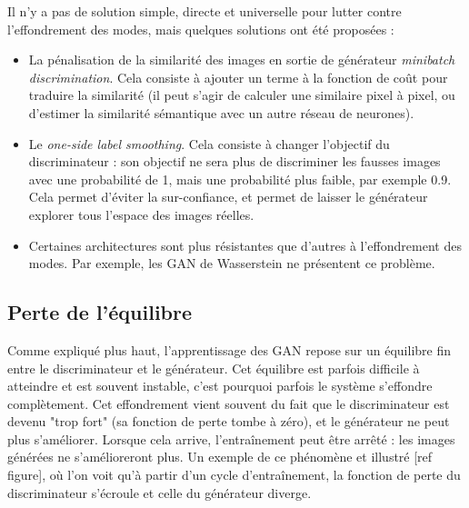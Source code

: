 Il n'y a pas de solution simple, directe et universelle pour lutter contre l'effondrement des modes, mais quelques solutions ont été proposées :
\begin{itemize}
  \item La pénalisation de la similarité des images en sortie de générateur \textit{minibatch discrimination}. Cela consiste à ajouter un terme à la fonction de coût pour traduire la similarité (il peut s'agir de calculer une similaire pixel à pixel, ou d'estimer la similarité sémantique avec un autre réseau de neurones).
  \item Le \textit{one-side label smoothing}. Cela consiste à changer l'objectif du discriminateur : son objectif ne sera plus de discriminer les fausses images avec une probabilité de 1, mais une probabilité plus faible, par exemple 0.9. Cela permet d'éviter la sur-confiance, et permet de laisser le générateur explorer tous l'espace des images réelles.
  \item Certaines architectures sont plus résistantes que d'autres à l'effondrement des modes. Par exemple, les GAN de Wasserstein ne présentent ce problème.
\end{itemize}


\subsection{Perte de l'équilibre}

Comme expliqué plus haut, l'apprentissage des GAN repose sur un équilibre fin entre le discriminateur et le générateur. Cet équilibre est parfois difficile à atteindre et est souvent instable, c'est pourquoi parfois le système s'effondre complètement. Cet effondrement vient souvent du fait que le discriminateur est devenu "trop fort" (sa fonction de perte tombe à zéro), et le générateur ne peut plus s'améliorer. Lorsque cela arrive, l’entraînement peut être arrêté : les images générées ne s'amélioreront plus. Un exemple de ce phénomène et illustré [ref figure], où l'on voit qu'à partir d'un cycle d’entraînement, la fonction de perte du discriminateur s'écroule et celle du générateur diverge.

